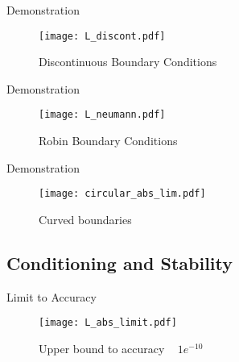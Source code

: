\documentclass[envcountsect notes]{beamer}       %
\begin{document}
\begin{frame}{Demonstration}
    \begin{figure}[t]
        \texttt{[image: L\_discont.pdf]}
        \vspace{-3em}
        \caption*{Discontinuous Boundary Conditions}
    \end{figure}
\end{frame}

\begin{frame}{Demonstration}
    \begin{figure}[t]
        \texttt{[image: L\_neumann.pdf]}
        \vspace{-3em}
        \caption*{Robin Boundary Conditions}
    \end{figure}
\end{frame}

\begin{frame}{Demonstration}
    \begin{figure}[t]
        \texttt{[image: circular\_abs\_lim.pdf]}
        \vspace{-3em}
        \caption*{Curved boundaries}
    \end{figure}
\end{frame}

\subsection{Conditioning and Stability}
\begin{frame}{Limit to Accuracy}
    \begin{figure}[t]
        \vspace{-1em}
        \texttt{[image: L\_abs\_limit.pdf]}
        \vspace{-3em}
        \caption*{Upper bound to accuracy ~ $1e^{-10}$}
    \end{figure}
\end{frame}

\end{document}
